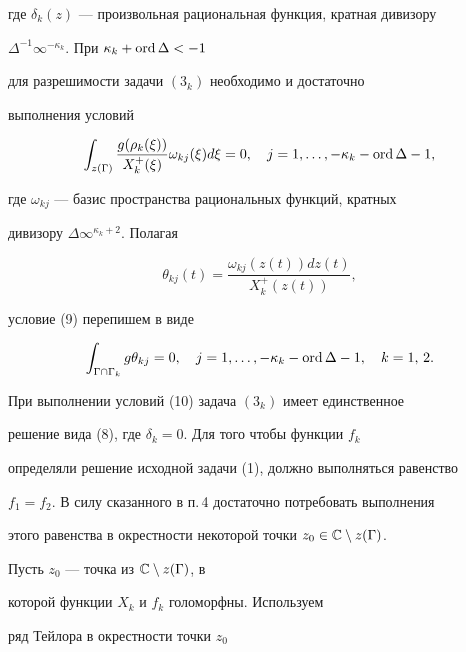 где $\delta_k(z)$ --- произвольная рациональная функция, кратная дивизору


$\Delta^{-1}\infty^{-\kappa_k}$. При $\kappa_k +\operatorname{ord}\Delta <-1$


для разрешимости задачи $(3_k)$ необходимо и достаточно


выполнения условий


\begin{equation}


\int_{z(\Gamma)}\frac{g(\rho_k(\xi))}{X_k^+(\xi)}\omega_{kj}(\xi)d\xi


=0,\quad j=1,\dotsc,-\kappa_k-\ord\Delta -1,


\end{equation}


где $\omega_{kj}$ --- базис пространства рациональных функций, кратных


дивизору $\Delta\infty^{\kappa_k+2}$. Полагая


$$


\theta_{kj}(t)=\frac{\omega_{kj}(z(t))dz(t)}{X^+_k(z(t))},


$$


условие (9) перепишем в виде


\begin{equation}


\int_{\Gamma\cap\Gamma_k}g\theta_{kj}=0,\quad j=


1,\dotsc,-\kappa_k-\ord\Delta -1,\quad k=1,\,2.


\end{equation}


При выполнении условий (10) задача $(3_k)$ имеет единственное


решение вида (8), где $\delta_k=0$. Для того чтобы функции $f_k$


определяли решение исходной задачи (1), должно выполняться равенство


$f_1=f_2$. В силу сказанного в п.\,4 достаточно потребовать выполнения


этого равенства в окрестности некоторой точки $z_0\in


\Bbb C\setminus z(\Gamma)$.





Пусть $z_0$ --- точка из $\Bbb C\setminus z(\Gamma)$, в


которой функции $X_k$ и $f_k$ голоморфны. Используем


ряд Тейлора в окрестности точки $z_0$


$$


